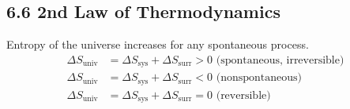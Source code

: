 \subsection{6.6 2nd Law of Thermodynamics}
    Entropy of the universe increases for any spontaneous process.
    \begin{align*}
        \Delta S_\text{univ} & = \Delta S_\text{sys} + \Delta S_\text{surr} > 0 \text{ (spontaneous, irreversible)}\\
        \Delta S_\text{univ} & = \Delta S_\text{sys} + \Delta S_\text{surr} < 0 \text{ (nonspontaneous)}\\
        \Delta S_\text{univ} & = \Delta S_\text{sys} + \Delta S_\text{surr} = 0 \text{ (reversible)}
    \end{align*}